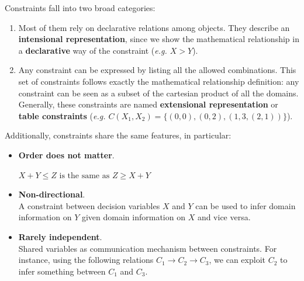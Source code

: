 Constraints fall into two broad categories:
\begin{enumerate}
    \item Most of them rely on declarative relations among objects. They describe an \textbf{intensional representation}, since we show the mathematical relationship in a \textbf{declarative} way of the constraint (\textit{e.g. $X > Y$}). 
    \item Any constraint can be expressed by listing all the allowed combinations. This set of constraints follows exactly the mathematical relationship definition: any constraint can be seen as a subset of the cartesian product of all the domains. Generally, these constraints are named \textbf{extensional representation} or \textbf{table constraints} (\textit{e.g. $C(X_1, X_2) = \{(0,0), (0,2), (1,3, (2,1))\}$}).
\end{enumerate}
Additionally, constraints share the same features, in particular:
\begin{itemize}
    \renewcommand{\labelitemi}{-}
    \item \textbf{Order does not matter}. \vspace{3.5pt}
    \begin{center}
        $X + Y \leq Z \text{ is the same as } Z \geq X + Y$
    \end{center}
    \item \textbf{Non-directional}. \\ A constraint between decision variables $X$ and $Y$ can be used to infer domain information on $Y$ given domain information on $X$ and vice versa.
    \item \textbf{Rarely independent}. \\ Shared variables as communication mechanism between constraints. For instance, using the following relations $C_1 \rightarrow C_2 \rightarrow C_3$, we can exploit $C_2$ to infer something between $C_1$ and $C_3$. 
\end{itemize}
